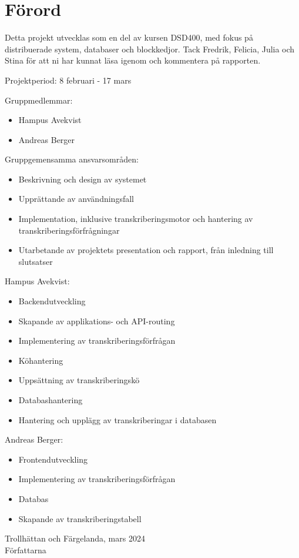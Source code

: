 \thispagestyle{plain}

\section{Förord}
Detta projekt utvecklas som en del av kursen DSD400, med fokus på
distribuerade system, databaser och blockkedjor. Tack Fredrik, Felicia, Julia
och Stina för att ni har kunnat läsa igenom och kommentera på rapporten.

Projektperiod: 8 februari - 17 mars

Gruppmedlemmar:
\begin{itemize}
    \item Hampus Avekvist
    \item Andreas Berger
\end{itemize}

Gruppgemensamma ansvarsområden:
\begin{itemize}
    \item Beskrivning och design av systemet
    \item Upprättande av användningsfall
    \item Implementation, inklusive transkriberingsmotor och hantering av transkriberingsförfrågningar
    \item Utarbetande av projektets presentation och rapport, från inledning till slutsatser
\end{itemize}

Hampus Avekvist:
\begin{itemize}
    \item Backendutveckling
    \item Skapande av applikations- och API-routing
    \item Implementering av transkriberingsförfrågan
    \item Köhantering
    \item Uppsättning av transkriberingskö
    \item Databashantering
    \item Hantering och upplägg av transkriberingar i databasen
\end{itemize}

Andreas Berger:
\begin{itemize}
    \item Frontendutveckling
    \item Implementering av transkriberingsförfrågan
    \item Databas
    \item Skapande av transkriberingstabell
\end{itemize}

Trollhättan och Färgelanda, mars 2024 \\
Författarna
